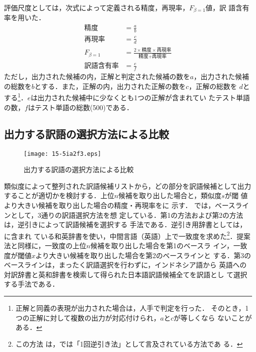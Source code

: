 \documentclass[japanese]{jnlp_1.4}
\newcommand{\figref}[1]{}
\begin{document}
評価尺度としては，次式によって定義される精度，再現率，$F_{\beta=1}$値，訳
語含有率を用いた．
{\allowdisplaybreaks
\begin{align*}
  \mbox{精度} &= \frac{a}{b} \\
  \mbox{再現率} &= \frac{c}{d} \\
  F_{\beta=1} &= \frac{2\times\mbox{精度}\times\mbox{再現率}}{\mbox{精度}+\mbox{再現率}} \\
  \mbox{訳語含有率} &= \frac{e}{f}
\end{align*}
}
ただし，出力された候補の内，正解と判定された候補の数を$a$，出力された候補
の総数を$b$とする．また，正解の内，出力された正解の数を$c$，正解の総数を
$d$とする\footnote{正解と同義の表現が出力された場合は，人手で判定を行った．
そのとき，1つの正解に対して複数の出力が対応付けられ，$a$と$c$が等しくなら
ないことがある．}．$e$は出力された候補中に少なくとも1つの正解が含まれてい
たテスト単語の数，$f$はテスト単語の総数(500)である．


\subsection{出力する訳語の選択方法による比較}
\label{subsec:閾値の比較}

\begin{figure}[b]
  \begin{center}
   \texttt{[image: 15-5ia2f3.eps]}
  \end{center}
  \caption{出力する訳語の選択方法による比較}
  \label{fig:閾値の比較}
\end{figure}

類似度によって整列された訳語候補リストから，どの部分を訳語候補として出力
することが適切かを検討する．上位$n$候補を取り出した場合と，類似度$s$が閾
値より大きい候補を取り出した場合の精度・再現率を\figref{fig:閾値の比較}に
示す．
\figref{fig:閾値の比較}では，ベースラインとして，3通りの訳語選択方法を想
定している．第1の方法および第2の方法は，逆引きによって訳語候補を選択する
手法\cite{日仏対訳辞書}である．逆引き用辞書としては，\cite{EJDIC}に含まれ
ている和英辞書を使い，中間言語（英語）上で一致度を求めた\footnote{この方法
は，\cite{日仏対訳辞書}では「1回逆引き法」として言及されている方法であ
る．}．提案法と同様に，一致度の上位$n$候補を取り出した場合を第1のベースラ
イン，一致度が閾値$x$より大きい候補を取り出した場合を第2のベースラインと
する．第3のベースラインは，まったく訳語選択を行わずに，インドネシア語から
英語への対訳辞書と英和辞書を検索して得られた日本語訳語候補全てを訳語とし
て選択する手法である．
\end{document}
